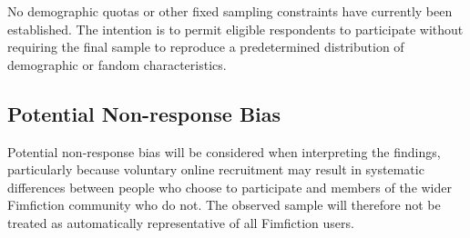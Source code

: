 No demographic quotas or other fixed sampling constraints have currently been established. The intention is to permit eligible respondents to participate without requiring the final sample to reproduce a predetermined distribution of demographic or fandom characteristics.


\subsection{Potential Non-response Bias}

Potential non-response bias will be considered when interpreting the findings, particularly because voluntary online recruitment may result in systematic differences between people who choose to participate and members of the wider Fimfiction community who do not. The observed sample will therefore not be treated as automatically representative of all Fimfiction users.

